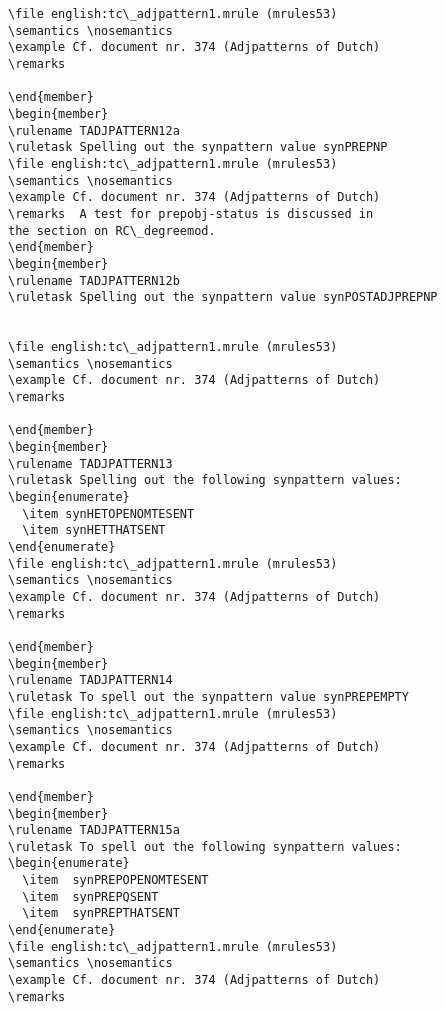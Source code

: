 \begin{verbatim}
\file english:tc\_adjpattern1.mrule (mrules53)
\semantics \nosemantics
\example Cf. document nr. 374 (Adjpatterns of Dutch)
\remarks

\end{member}
\begin{member}
\rulename TADJPATTERN12a
\ruletask Spelling out the synpattern value synPREPNP
\file english:tc\_adjpattern1.mrule (mrules53)
\semantics \nosemantics
\example Cf. document nr. 374 (Adjpatterns of Dutch)
\remarks  A test for prepobj-status is discussed in 
the section on RC\_degreemod.
\end{member}
\begin{member}
\rulename TADJPATTERN12b
\ruletask Spelling out the synpattern value synPOSTADJPREPNP


\file english:tc\_adjpattern1.mrule (mrules53)
\semantics \nosemantics
\example Cf. document nr. 374 (Adjpatterns of Dutch)
\remarks

\end{member}
\begin{member}
\rulename TADJPATTERN13
\ruletask Spelling out the following synpattern values:
\begin{enumerate}
  \item synHETOPENOMTESENT
  \item synHETTHATSENT
\end{enumerate}
\file english:tc\_adjpattern1.mrule (mrules53)
\semantics \nosemantics
\example Cf. document nr. 374 (Adjpatterns of Dutch)
\remarks

\end{member}
\begin{member}
\rulename TADJPATTERN14
\ruletask To spell out the synpattern value synPREPEMPTY
\file english:tc\_adjpattern1.mrule (mrules53)
\semantics \nosemantics
\example Cf. document nr. 374 (Adjpatterns of Dutch)
\remarks

\end{member}
\begin{member}
\rulename TADJPATTERN15a
\ruletask To spell out the following synpattern values:
\begin{enumerate}
  \item  synPREPOPENOMTESENT
  \item  synPREPQSENT
  \item  synPREPTHATSENT
\end{enumerate}
\file english:tc\_adjpattern1.mrule (mrules53)
\semantics \nosemantics
\example Cf. document nr. 374 (Adjpatterns of Dutch)
\remarks


\end{verbatim}
